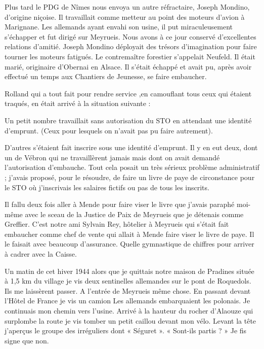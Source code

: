 \vspace{0.45cm}

Plus tard le PDG de Nîmes nous envoya un autre réfractaire, Joseph Mondino, d’origine
niçoise. Il travaillait comme metteur au point des moteurs d’avion à Marignane. Les
allemands ayant envahi son usine, il put miraculeusement s’échapper et fut dirigé sur
Meyrueis. Nous avons à ce jour conservé d’excellentes relations d’amitié. Joseph Mondino
déployait des trésors d’imagination pour faire tourner les moteurs fatigués. Le contremaître
forestier s’appelait Neufeld. Il était marié, originaire d’Obernai en Alsace. Il s’était échappé
et avait pu, après avoir effectué un temps aux Chantiers de Jeunesse, se faire embaucher.

\vspace{0.45cm}

Rolland qui a tout fait pour rendre service ,en camouflant tous ceux qui étaient traqués, en
était arrivé à la situation suivante :


Un petit nombre travaillait sans autorisation du STO en attendant une identité d’emprunt.
(Ceux pour lesquels on n’avait pas pu faire autrement).

\vspace{0.45cm}

D’autres s’étaient fait inscrire sous une identité d’emprunt. Il y en eut deux, dont un de
Vébron qui ne travaillèrent jamais mais dont on avait demandé l’autorisation d’embauche.
Tout cela posait un très sérieux problème administratif ; j’avais proposé, pour le résoudre, de
faire un livre de paye de circonstance pour le STO où j’inscrivais les salaires fictifs ou pas de
tous les inscrits.

\vspace{0.45cm}

Il fallu deux fois aller à Mende pour faire viser le livre que j’avais paraphé moi-même avec le
sceau de la Justice de Paix de Meyrueis que je détenais comme Greffier. C’est notre ami
Sylvain Rey, hôtelier à Meyrueis qui s’était fait embaucher comme chef de vente qui allait à
Mende faire viser le livre de paye. Il le faisait avec beaucoup d’assurance. Quelle
gymnastique de chiffres pour arriver à cadrer avec la Caisse.

\vspace{0.45cm}

Un matin de cet hiver 1944 alors que je quittais notre maison de Pradines située à 1,5 km du
village je vis deux sentinelles allemandes sur le pont de Roquedols. Ils me laissèrent passer. A
l’entrée de Meyrueis même chose. En passant devant l’Hôtel de France je vis un camion Les
allemands embarquaient les polonais. Je continuais mon chemin vers l’usine. Arrivé à la
hauteur du rocher d’Alaouze qui surplombe la route je vis tomber un petit caillou devant mon
vélo. Levant la tête j’aperçus le groupe des irréguliers dont « Séguret ». « Sont-ils partis ? »
Je fis signe que non.

